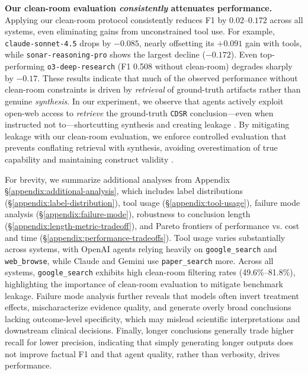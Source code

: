 \documentclass{article}
\begin{document}
 
\textbf{Our clean-room evaluation \textit{consistently} attenuates performance.} Applying our clean-room protocol consistently reduces F1 by $0.02$–$0.172$ across all systems, even eliminating gains from unconstrained tool use. For example, \texttt{claude-sonnet-4.5} drops by $-0.085$, nearly offsetting its $+0.091$ gain with tools, while \texttt{sonar-reasoning-pro} shows the largest decline ($-0.172$). Even top-performing \texttt{o3-deep-research} (F1 0.508 without clean-room) degrades sharply by $-0.17$. These results indicate that much of the observed performance without clean-room constraints is driven by \textit{retrieval} of ground-truth artifacts rather than genuine \textit{synthesis}. In our experiment, we observe that agents actively exploit open-web access to \textit{retrieve} the ground-truth \texttt{CDSR} conclusion---even when instructed not to---shortcutting synthesis %
and creating leakage \cite{xu2024benchmarking}. By mitigating leakage with our clean-room evaluation, we enforce controlled evaluation that prevents conflating retrieval with synthesis, avoiding overestimation of true capability and maintaining construct validity \cite{zhou2026general}.



For brevity, we summarize additional analyses from Appendix \S\ref{appendix:additional-analysis}, which includes label distributions (\S\ref{appendix:label-distribution}), tool usage (\S\ref{appendix:tool-usage}), failure mode analysis (\S\ref{appendix:failure-mode}), robustness to conclusion length (\S\ref{appendix:length-metric-tradeoff}), and Pareto frontiers of performance vs. cost and time (\S\ref{appendix:performance-tradeoffs}). Tool usage varies substantially across systems, with OpenAI agents relying heavily on \texttt{google\_search} and \texttt{web\_browse}, while Claude and Gemini use \texttt{paper\_search} more. Across all systems, \texttt{google\_search} exhibits high clean-room filtering rates (49.6\%--81.8\%), highlighting the importance of clean-room evaluation to mitigate benchmark leakage. Failure mode analysis further reveals that models often invert treatment effects, mischaracterize evidence quality, and generate overly broad conclusions lacking outcome-level specificity, which may mislead scientific interpretations and downstream clinical decisions. Finally, longer conclusions generally trade higher recall for lower precision, indicating that simply generating longer outputs does not improve factual F1 and that agent quality, rather than verbosity, drives performance.
\end{document}

